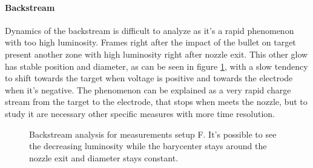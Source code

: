 \paragraph{Backstream}
Dynamics of the backstream is difficult to analyze as it's a rapid phenomenon with too high luminosity. Frames right after the impact of the bullet on target present another zone with high luminosity right after nozzle exit. This other glow has stable position and diameter, as can be seen in figure \ref{fig:elio_a_back}, with a slow tendency to shift towards the target when voltage is positive and towards the electrode when it's negative.
The phenomenon can be explained as a very rapid charge stream from the target to the electrode, that stops when meets the nozzle, but to study it are necessary other specific measures with more time resolution.
\begin{figure}
 \centering
 \hfill
 
 \hfill
 \caption{Backstream analysis for measurements setup F. It's possible to see the decreasing luminosity while the barycenter stays around the nozzle exit and diameter stays constant.}
 \label{fig:elio_a_back}
\end{figure}



